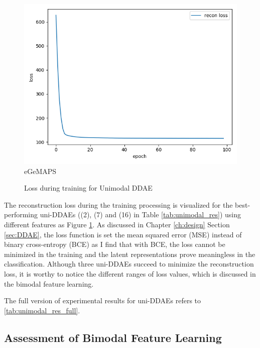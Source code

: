 \begin{figure}
\begin{minipage}[c]{0.31\linewidth}
    \centering
    \includegraphics[width=\textwidth]{images/results/unimodal_egemaps_hidden050_batch1024_epoch100_noise01.png} \\
    eGeMAPS
    \end{minipage}
    \caption{Loss during training for Unimodal DDAE}
    \label{fig:loss_unimodal}
\end{figure}

The reconstruction loss during the training processing is visualized for the best-performing uni-DDAEs ((2), (7) and (16) in Table \ref{tab:unimodal_res}) using different features as Figure \ref{fig:loss_unimodal}. As discussed in Chapter \ref{ch:design} Section \ref{sec:DDAE}, the loss function is set the mean squared error (MSE) instead of binary cross-entropy (BCE) as I find that with BCE, the loss cannot be minimized in the training and the latent representations prove meaningless in the classification. Although three uni-DDAEs succeed to minimize the reconstruction loss, it is worthy to notice the different ranges of loss values, which is discussed in the bimodal feature learning.

The full version of experimental results for uni-DDAEs refers to \ref{tab:unimodal_res_full}.




\subsection{Assessment of Bimodal Feature Learning}

